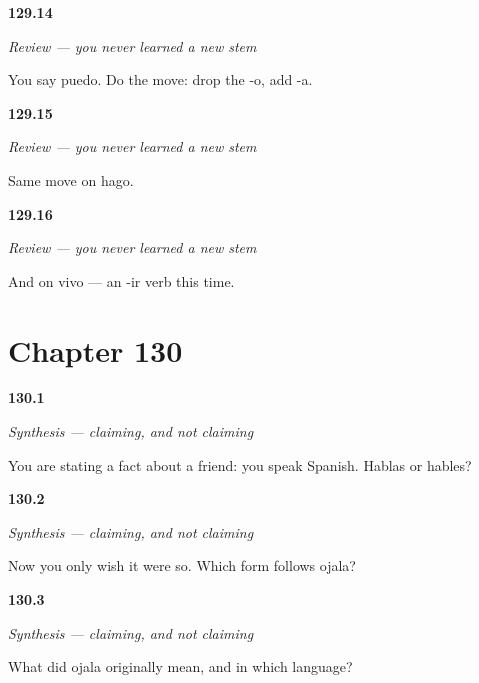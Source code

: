 \noindent\begin{minipage}[t]{\linewidth}
\raggedright
\hypertarget{review-ES-C18-repaso-el-yo-que-viaja-build}{\textbf{129.14}} \emph{Review — you never learned a new stem}\par
\small You say puedo. Do the move: drop the -o, add -a.
\end{minipage}\par\medskip

\noindent\begin{minipage}[t]{\linewidth}
\raggedright
\hypertarget{review-ES-C18-repaso-el-yo-que-viaja-hago}{\textbf{129.15}} \emph{Review — you never learned a new stem}\par
\small Same move on hago.
\end{minipage}\par\medskip

\noindent\begin{minipage}[t]{\linewidth}
\raggedright
\hypertarget{review-ES-C18-repaso-el-yo-que-viaja-vivo}{\textbf{129.16}} \emph{Review — you never learned a new stem}\par
\small And on vivo — an -ir verb this time.
\end{minipage}\par\medskip

\section*{Chapter 130}

\noindent\begin{minipage}[t]{\linewidth}
\raggedright
\hypertarget{review-ES-C18-sintesis-subjuntivo-assert}{\textbf{130.1}} \emph{Synthesis — claiming, and not claiming}\par
\small You are stating a fact about a friend: you speak Spanish. Hablas or hables?
\end{minipage}\par\medskip

\noindent\begin{minipage}[t]{\linewidth}
\raggedright
\hypertarget{review-ES-C18-sintesis-subjuntivo-wish}{\textbf{130.2}} \emph{Synthesis — claiming, and not claiming}\par
\small Now you only wish it were so. Which form follows ojala?
\end{minipage}\par\medskip

\noindent\begin{minipage}[t]{\linewidth}
\raggedright
\hypertarget{review-ES-C18-sintesis-subjuntivo-ojala}{\textbf{130.3}} \emph{Synthesis — claiming, and not claiming}\par
\small What did ojala originally mean, and in which language?
\end{minipage}\par\medskip

